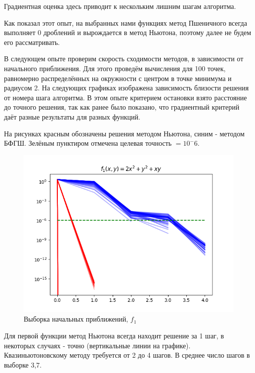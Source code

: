 Градиентная оценка здесь приводит к нескольким лишним шагам алгоритма.



Как показал этот опыт, на выбранных нами функциях метод Пшеничного всегда выполняет 0 дроблений и вырождается в метод Ньютона, поэтому далее не будем его рассматривать.

В следующем опыте проверим скорость сходимости методов, в зависимости от начального приближения.
Для этого проведём вычисления для 100 точек, равномерно распределённых на окружности с центром в точке минимума и радиусом 2.
На следующих графиках изображена зависимость близости решения от номера шага алгоритма.
В этом опыте критерием остановки взято расстояние до точного решения, так как ранее было показано, что градиентный критерий даёт разные результаты для разных функций.

На рисунках красным обозначены решения методом Ньютона, синим - методом БФГШ.
Зелёным пунктиром отмечена целевая точность $= 10^-6$.

\begin{figure}[H]
			\centering
			\includegraphics[scale=0.75]{figures/init_100_func1}
			\caption{Выборка начальных приближений, $f_1$}
			\label{fig:init_100_func1}
\end{figure}

Для первой функции метод Ньютона всегда находит решение за 1 шаг, в некоторых случаях - точно (вертикальные линии на графике).
Квазиньютоновскому методу требуется от 2 до 4 шагов.
В среднее число шагов в выборке 3,7.


